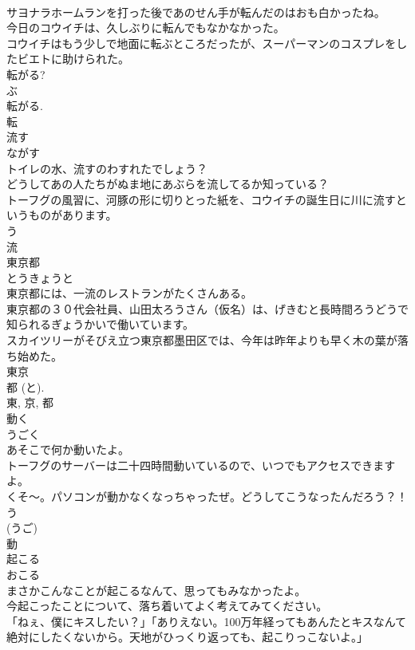 \documentclass[8pt]{extreport}
\begin{document}
\begin{CJK}{UTF8}{min}
\\	サヨナラホームランを打った後であのせん手が転んだのはおも白かったね。	
\\	今日のコウイチは、久しぶりに転んでもなかなかった。	
\\	コウイチはもう少しで地面に転ぶところだったが、スーパーマンのコスプレをしたビエトに助けられた。	
\\	転がる? 
\\	ぶ 
\\	転がる. 
\\	転	
\\	流す	
\\	ながす	
\\	トイレの水、流すのわすれたでしょう？	
\\	どうしてあの人たちがぬま地にあぶらを流してるか知っている？	
\\	トーフグの風習に、河豚の形に切りとった紙を、コウイチの誕生日に川に流すというものがあります。	
\\	う 
\\	流	
\\	東京都	
\\	とうきょうと	
\\	東京都には、一流のレストランがたくさんある。	
\\	東京都の３０代会社員、山田太ろうさん（仮名）は、げきむと長時間ろうどうで知られるぎょうかいで働いています。	
\\	スカイツリーがそびえ立つ東京都墨田区では、今年は昨年よりも早く木の葉が落ち始めた。	
\\	東京 
\\	都 (と). 
\\	東, 京, 都	
\\	動く	
\\	うごく	
\\	あそこで何か動いたよ。	
\\	トーフグのサーバーは二十四時間動いているので、いつでもアクセスできますよ。	
\\	くそ〜。パソコンが動かなくなっちゃったぜ。どうしてこうなったんだろう？！	
\\	う 
\\	(うご) 
\\	動	
\\	起こる	
\\	おこる	
\\	まさかこんなことが起こるなんて、思ってもみなかったよ。	
\\	今起こったことについて、落ち着いてよく考えてみてください。	
\\	「ねぇ、僕にキスしたい？」「ありえない。100万年経ってもあんたとキスなんて絶対にしたくないから。天地がひっくり返っても、起こりっこないよ。」	

\end{CJK}
\end{document}
